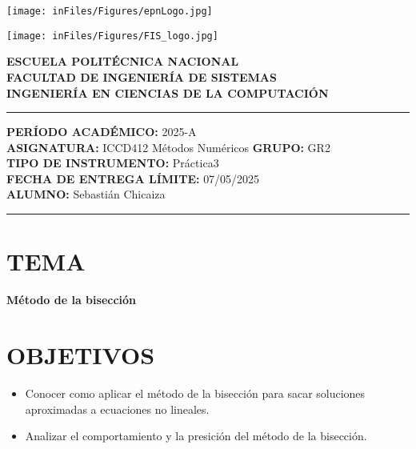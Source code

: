 \documentclass[12pt]{article}
\begin{document}
\begin{minipage}{0.45\textwidth}
    \texttt{[image: inFiles/Figures/epnLogo.jpg]}
\end{minipage}
\hfill
\begin{minipage}{0.45\textwidth}
    \raggedleft
    \texttt{[image: inFiles/Figures/FIS\_logo.jpg]}
\end{minipage}

\vspace{0.5cm}

\begin{center}
    \textbf{ESCUELA POLITÉCNICA NACIONAL}\\[0.2cm]
    \textbf{FACULTAD DE INGENIERÍA DE SISTEMAS}\\[0.2cm]
    \textbf{INGENIERÍA EN CIENCIAS DE LA COMPUTACIÓN}
\end{center}

\vspace{0.5cm}
\hrule
\vspace{0.5cm}

\noindent\textbf{PERÍODO ACADÉMICO:} 2025-A\\[0.2cm]
\noindent\textbf{ASIGNATURA:} ICCD412 Métodos Numéricos \hfill \textbf{GRUPO:} GR2\\[0.2cm]
\noindent\textbf{TIPO DE INSTRUMENTO:} Práctica3\\[0.2cm]
\noindent\textbf{FECHA DE ENTREGA LÍMITE:} {07/05/2025}\\[0.2cm]
\noindent\textbf{ALUMNO:} {Sebastián Chicaiza}

\vspace{0.5cm}
\hrule
\vspace{1cm}


\section*{TEMA}

\begin{center}
    \Large\textbf{Método de la bisección}
\end{center}
\vspace{0.5cm}

\section*{OBJETIVOS}
\begin{itemize}
    \item {Conocer como aplicar el método de la bisección para sacar soluciones aproximadas a ecuaciones no lineales.}
    \item {Analizar el comportamiento y la presición del método de la bisección.}
\end{itemize}
\vspace{0.5cm}
\end{document}
